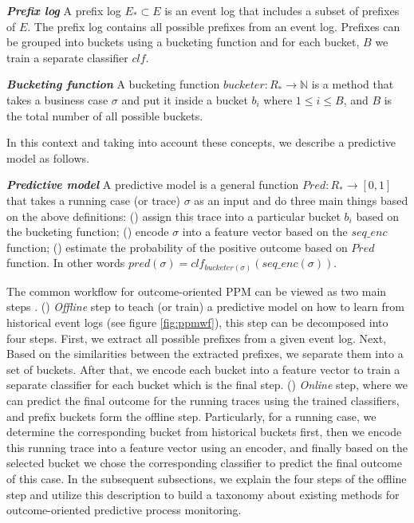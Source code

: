 \begin{definition}{\textit{\textbf{Prefix log}}}
	A prefix log $E_* \subset E$  is an event log that includes a subset of prefixes of $E$. The prefix log contains all possible prefixes from an event log.
	Prefixes can be grouped into buckets using a bucketing function and for each bucket, $B$ we train a separate classifier $clf$.		
\end{definition}

\begin{definition}{\textit{\textbf{Bucketing function}}}
	A bucketing function $bucketer: R_* \to \mathbb{N}$ is a method that takes a business case $\sigma$ and put it inside a bucket $b_i$ where $1 \le i \le B$, and $B$ is the total number of all possible buckets. 		
\end{definition}
In this context and taking into account these concepts, we describe a predictive model as follows. 

\begin{definition}{\textit{\textbf{Predictive model}}}
	A predictive model is a general function $Pred: R_* \to [0,1]$ that takes a running case (or trace) $\sigma$ as an input and do three main things based on the above definitions: () assign this trace into a particular bucket $b_i$ based on the bucketing function;  () encode $\sigma$ into a feature vector based on the $seq\_enc$ function; () estimate the probability of the positive outcome based on $Pred$ function.  In other words $pred (\sigma) = clf_{bucketer(\sigma)}(seq\_enc(\sigma))$.	 		
\end{definition}
 
 
The common workflow for outcome-oriented PPM can be viewed as two main steps \cite{teinemaa2019outcome}. () \textit{Offline} step to teach (or train) a predictive model on how to learn from historical event logs (see figure \ref{fig:ppmwf}), this step can be decomposed into four steps. First, we extract all possible prefixes from a given event log. Next, Based on the similarities between the extracted prefixes, we separate them into a set of buckets. After that, we encode each bucket into a feature vector to train a separate classifier for each bucket which is the final step. () \textit{Online} step, where we can predict the final outcome for the running traces using the trained classifiers, and prefix buckets form the offline step. Particularly, for a running case, we determine the corresponding bucket from historical buckets first, then we encode this running trace into a feature vector using an encoder, and finally based on the selected bucket we chose the corresponding classifier to predict the final outcome of this case.  In the subsequent subsections, we explain the four steps of the offline step and utilize this description to build a taxonomy about existing methods for outcome-oriented predictive process monitoring. 



